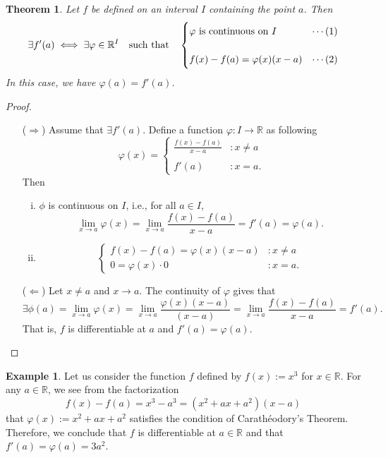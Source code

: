 \documentclass[12pt,openany]{book}
\newtheorem{theorem}{Theorem}[chapter]
\theoremstyle{definition}
\newtheorem{example}{Example}[chapter]
\newcommand{\R}{\mathbb{R}}
\newcommand{\ie}{\textnormal{i.e.}}
\newcommand{\Caratheodroy}{Carath\'{e}odory}
\begin{document}
	\begin{tcolorbox}[colback=white,colframe=thmcolor,arc=5pt,title={\color{white}\bf $\star$ \Caratheodroy's Theorem $\star$}]
		\begin{theorem}
			Let $f$ be defined on an interval $I$ containing the point $a$. Then \[
			\exists f'(a)\iff\exists\varphi\in\R^I\quad\textnormal{such that}\quad
			\begin{cases}
				\textnormal{$\varphi$ is continuous on $I$}&\cdots\textnormal{(1)}\\
				\\
				f(x)-f(a)=\varphi(x)(x-a)&\cdots\textnormal{(2)}
			\end{cases}
			\] In this case, we have $\varphi(a)=f'(a)$.
		\end{theorem}
	\end{tcolorbox}
	\begin{proof}
		\begin{itemize}
			\item[($\Rightarrow$)] Assume that $\exists f'(a)$. Define a function $\varphi:I\to\R$ as following \[
			\varphi(x)=\begin{cases}
				\displaystyle\frac{f(x)-f(a)}{x-a} &:x\neq a\\
				\\
				f'(a) &:x=a.
			\end{cases}
			\] Then \begin{enumerate}[(i)]
				\item $\phi$ is continuous on $I$, \ie, for all $a\in I$, $$\lim\limits_{x\to a}\varphi(x)=\lim\limits_{x\to a}\frac{f(x)-f(a)}{x-a}=f'(a)=\varphi(a).$$
				\item \[
				\begin{cases}
					f(x)-f(a)=\varphi(x)(x-a) &: x\neq a\\
					0=\varphi(x)\cdot 0 &: x=a.
				\end{cases}
				\]
			\end{enumerate}
			\item[($\Leftarrow$)] Let $x\neq a$ and $x\to a$. The continuity of $\varphi$ gives that \[
			\exists\phi(a)=\lim\limits_{x\to a}\varphi(x)=\lim\limits_{x\to a}\frac{\varphi(x)(x-a)}{(x-a)}=\lim\limits_{x\to a}\frac{f(x)-f(a)}{x-a}=f'(a).
			\] That is, $f$ is differentiable at $a$ and $f'(a)=\varphi(a)$.
		\end{itemize}
	\end{proof}
	\vspace{4pt}
	\begin{example}
		Let us consider the function $f$ defined by $f(x):=x^3$ for $x\in\R$. For any $a\in\R$, we see from the factorization \[
		f(x)-f(a)=x^3-a^3=(x^2+ax+a^2)(x-a)
		\] that $\varphi(x):=x^2+ax+a^2$ satisfies the condition of \Caratheodroy's Theorem. Therefore, we conclude that $f$ is differentiable at $a\in\R$ and that $f'(a)=\varphi(a)=3a^2$.
	\end{example}
	
\end{document}
